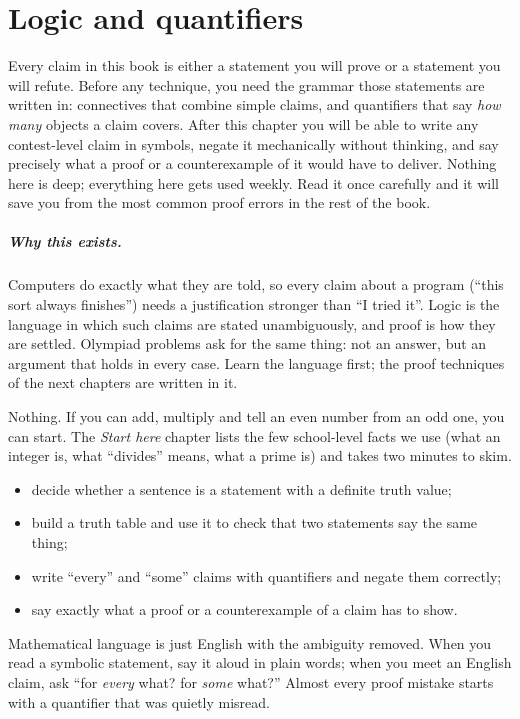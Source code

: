 \chapter{Logic and quantifiers}\label{ch:logic}

Every claim in this book is either a statement you will prove or a statement you will
refute. Before any technique, you need the grammar those statements are written in:
connectives that combine simple claims, and quantifiers that say \emph{how many} objects
a claim covers. After this chapter you will be able to write any contest-level claim in
symbols, negate it mechanically without thinking, and say precisely what a proof or a
counterexample of it would have to deliver. Nothing here is deep; everything here gets
used weekly. Read it once carefully and it will save you from the most common proof
errors in the rest of the book.

\paragraph{Why this exists.} Computers do exactly what they are told, so every claim about a program
(``this sort always finishes'') needs a justification stronger than ``I tried it''. Logic is the language
in which such claims are stated unambiguously, and proof is how they are settled. Olympiad problems ask for
the same thing: not an answer, but an argument that holds in every case. Learn the language first; the proof
techniques of the next chapters are written in it.

\begin{rulebox}
Nothing. If you can add, multiply and tell an even number from an odd one, you can start. The \emph{Start here} chapter lists the few school-level facts we use (what an integer is, what ``divides'' means, what a prime is) and takes two minutes to skim.
\end{rulebox}
\begin{wins}
\begin{itemize}
\item decide whether a sentence is a statement with a definite truth value;
\item build a truth table and use it to check that two statements say the same thing;
\item write ``every'' and ``some'' claims with quantifiers and negate them correctly;
\item say exactly what a proof or a counterexample of a claim has to show.
\end{itemize}
\end{wins}
\begin{principle}
Mathematical language is just English with the ambiguity removed. When you read a symbolic statement, say it aloud in plain words; when you meet an English claim, ask ``for \emph{every} what? for \emph{some} what?'' Almost every proof mistake starts with a quantifier that was quietly misread.
\end{principle}

